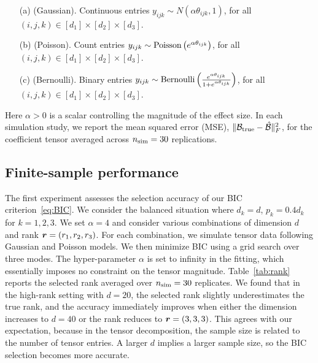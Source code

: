 \documentclass[12pt]{article}
\theoremstyle{definition}
\theoremstyle{definition}
\begin{document}
\begin{enumerate}
\item[(a)] (Gaussian). Continuous entries $y_{ijk}\sim N\left(\alpha \theta_{ijk}, 1\right)$, for all $(i,j,k)\in[d_1]\times[d_2]\times[d_3]$.
\item[(b)] (Poisson). Count entries $y_{ijk}\sim\textup{Poisson}\left( e^{\alpha \theta_{ijk}}\right)$, for all $(i,j,k)\in[d_1]\times[d_2]\times[d_3]$.
\item[(c)] (Bernoulli). Binary entries $y_{ijk}\sim \textup{Bernoulli}\left( \frac{e^{\alpha \theta_{ijk}}}{1+e^{\alpha \theta_{ijk}}}\right)$, for all $(i,j,k)\in[d_1]\times[d_2]\times[d_3]$.
\end{enumerate}
Here $\alpha>0$ is a scalar controlling the magnitude of the effect size. In each simulation study, we report the mean squared error (MSE), $\lVert\mathcal{B}_{\textup{true}}-\hat {\mathcal{B}}\rVert_F^2$, for the coefficient tensor averaged across $n_{\textup{sim}}=30$ replications. 

\subsection{Finite-sample performance}
The first experiment assesses the selection accuracy of our BIC criterion~\eqref{eq:BIC}. We consider the balanced situation where $d_k=d$, $p_k=0.4d_k$ for $k=1,2,3$. We set $\alpha=4$ and consider various combinations of dimension $d$ and rank $\bm{r}=(r_1,r_2,r_3)$. For each combination, we simulate tensor data following Gaussian and Poisson models. We then minimize BIC using a grid search over three modes. The hyper-parameter $\alpha$ is set to infinity in the fitting, which essentially imposes no constraint on the tensor magnitude. Table~\ref{tab:rank} reports the selected rank averaged over $n_{\textup{sim}}=30$ replicates. We found that in the high-rank setting with $d=20$, the selected rank slightly underestimates the true rank, and the accuracy immediately improves when either the dimension increases to $d = 40$ or the rank reduces to $\bm{r} = (3,3,3)$. This agrees with our expectation, because in the tensor decomposition, the sample size is related to the number of tensor entries. A larger $d$ implies a larger sample size, so the BIC selection becomes more accurate. 
\end{document}
